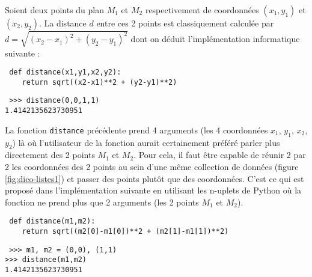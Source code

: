 \begin{ex}\label{ex:points}
Soient deux points du plan $M_1$ et $M_2$ respectivement de coordonnées $(x_1,y_1)$ et $(x_2,y_2)$.
La distance $d$ entre ces 2 points est classiquement calculée par $d = \sqrt{(x_2-x_1)^2 + (y_2-y_1)^2}$
dont on déduit l'implémentation informatique suivante :

\noindent\mbox{}\hspace*{1cm}\begin{py}{9cm}\tt
def distance(x1,y1,x2,y2):\\
\mbox{}\ \ \ \ return sqrt((x2-x1)**2 + (y2-y1)**2)
\end{py}
\hfill
\begin{py}{6cm}\tt
>>> distance(0,0,1,1)\\
1.4142135623730951
\end{py}
\end{ex}

\noindent La fonction {\tt distance} précédente prend 4 arguments 
(les 4 coordonnées $x_1$, $y_1$, $x_2$, $y_2$) là où l'utilisateur de la fonction
aurait certainement préféré parler plus directement des 2 points $M_1$ et $M_2$. 
Pour cela, il faut être capable de réunir 2 par 2 les coordonnées des 2 points au 
sein d'une même collection de données (figure \ref{fig:dico-listes1}) et passer des 
points plutôt que des coordonnées. C'est ce qui est proposé dans l'implémentation 
suivante en utilisant les n-uplets de {\sc Python} où la fonction ne prend plus que 
2 arguments (les 2 points $M_1$ et $M_2$).

\noindent\mbox{}\hspace*{1cm}\begin{py}{9cm}\tt
def distance(m1,m2):\\
\mbox{}\ \ \ \ return sqrt((m2[0]-m1[0])**2 + (m2[1]-m1[1])**2)
\end{py}
\hfill
\begin{py}{6cm}\tt
>>> m1, m2 = (0,0), (1,1)\\
>>> distance(m1,m2)\\
1.4142135623730951
\end{py}
\vspace*{2mm}

